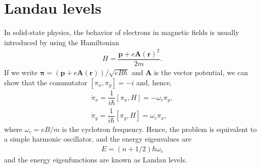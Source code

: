 \documentclass{report}
\newcommand{\f}[2]{\dfrac{#1}{#2}}
\begin{document}
\section{Landau levels}
In solid-state physics, the behavior of electrons in magnetic fields is usually introduced by using the Hamiltonian
\begin{gather}
	H = \f{\mathbf{p} + e \mathbf{A}(\mathbf{r})^{2}}{2m} .
\end{gather}
If we write $\boldsymbol{\pi} = (\mathbf{p} + e\mathbf{A}(\mathbf{r})) / \sqrt{e B \hbar}$ and $\mathbf{A}$ is the vector potential, we can show that the commutator
$\left[ \pi_{x},\pi_{y} \right] = -i$ and, hence,
\begin{gather}
	\dot{\pi}_{x} = \f{1}{i\hbar}\left[ \pi_{x}, H\right] = -\omega_{c} \pi_{y},\\
	\dot{\pi}_{y} = \f{1}{i\hbar}\left[ \pi_{y}, H\right] = \omega_{c} \pi_{x},
\end{gather}
where $\omega_{c} = eB / m$ is the cyclotron frequency. Hence, the problem is equivalent to a simple harmonic oscillator, and the energy eigenvalues are
\begin{gather}
	E = \left(n + 1/2\right) \hbar \omega_{c}
\end{gather}
and the energy eigenfunctions are known as Landau levels.
\end{document}

